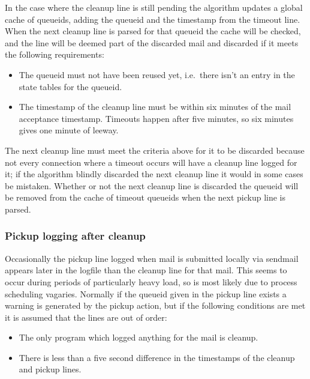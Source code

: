 \documentclass[a4paper,12pt,draft]{article}
\begin{document}
In the case where the cleanup line is still pending the algorithm updates a
global cache of queueids, adding the queueid and the timestamp from the
timeout line.  When the next cleanup line is parsed for that queueid the
cache will be checked, and the line will be deemed part of the discarded
mail and discarded if it meets the following requirements:

\begin{itemize}

    \item The queueid must not have been reused yet, i.e.\ there isn't an
        entry in the state tables for the queueid.

    \item The timestamp of the cleanup line must be within six minutes of
        the mail acceptance timestamp.  Timeouts happen after five minutes,
        so six minutes gives one minute of leeway.

\end{itemize}

The next cleanup line must meet the criteria above for it to be discarded
because not every connection where a timeout occurs will have a cleanup
line logged for it; if the algorithm blindly discarded the next cleanup
line it would in some cases be mistaken.  Whether or not the next cleanup
line is discarded the queueid will be removed from the cache of timeout
queueids when the next pickup line is parsed.

\subsubsection{Pickup logging after cleanup}

\label{pickup-logging-after-cleanup}

Occasionally the pickup line logged when mail is submitted locally via
sendmail appears later in the logfile than the cleanup line for that mail.
This seems to occur during periods of particularly heavy load, so is most
likely due to process scheduling vagaries.  Normally if the queueid given
in the pickup line exists a warning is generated by the pickup action, but
if the following conditions are met it is assumed that the lines are out of
order:

\begin{itemize}

    \item The only program which logged anything for the mail is cleanup.

    \item There is less than a five second difference in the timestamps of
        the cleanup and pickup lines.

\end{itemize}
\end{document}
